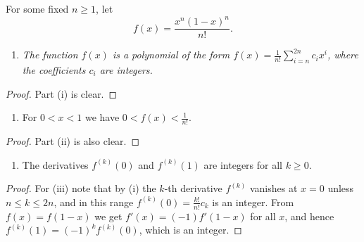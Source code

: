 \begin{lemma}
  \label{lem_aux_i}
  \leanok
  \upshape For some fixed $n \ge 1$, let
  \[
  f(x) = \frac{x^n (1-x)^n}{n!}.
  \]
  \begin{enumerate}
    \item[(i)] \itshape The function $f(x)$ is a polynomial of the form $f(x) = \frac{1}{n!} \sum_{i=n}^{2n} c_i x^i$, where the coefficients $c_i$ are integers.
  \end{enumerate}
\end{lemma}
\begin{proof}
  Part (i) is clear.
\end{proof}

\begin{lemma}
  \label{lem_aux_ii}
  \leanok
  \begin{enumerate}
  	\item[(ii)] For $0 < x < 1$ we have $0 < f(x) < \frac{1}{n!}$.
  \end{enumerate}
\end{lemma}
\begin{proof}
  Part (ii) is also clear.
\end{proof}


\begin{lemma}
  \label{lem_aux_iii}
  \leanok
  \begin{enumerate}
  	\item[(iii)] The derivatives $f^{(k)}(0)$ and $f^{(k)}(1)$ are integers for all $k \ge 0$.
  \end{enumerate}
\end{lemma}
\begin{proof}
  For (iii) note that by (i) the $k$-th derivative $f^{(k)}$ vanishes at $x=0$ unless $n \le k \le 2n$,
  and in this range $f^{(k)}(0) = \frac{k!}{n!} c_k$ is an integer.
  From $f(x) = f(1-x)$ we get $f'(x) = (-1) f'(1-x)$ for all $x$,
  and hence $f^{(k)}(1) = (-1)^k f^{(k)}(0)$, which is an integer.
\end{proof}

